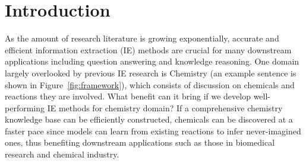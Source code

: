 
\noindent{}



\section{Introduction}
\label{intro}


As the amount of research literature is growing exponentially, accurate and efficient information extraction (IE) methods are crucial for many downstream applications including question answering and knowledge reasoning. One  domain largely overlooked by previous IE research is Chemistry (an example sentence is shown in Figure~\ref{fig:framework}), which consists of discussion on chemicals and reactions they are involved. What benefit can it bring if we develop well-performing IE methods for chemistry domain? If a comprehensive chemistry knowledge base can be efficiently constructed, chemicals can be discovered at a faster pace since models can learn from existing reactions to infer never-imagined ones, thus benefiting downstream applications such as those in biomedical research and chemical industry.  


